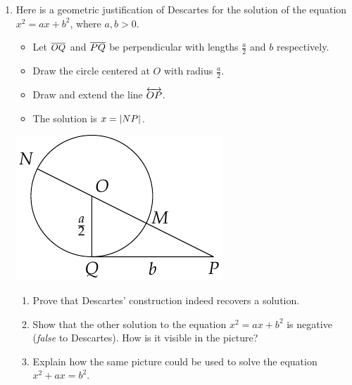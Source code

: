 \begin{exercises}{}{}
\begin{enumerate}
	  \item Here is a geometric justification of Descartes for the solution of the equation $x^2=ax+b^2$, where $a,b>0$.
	  \par
		\begin{minipage}[t]{0.6\linewidth}\vspace{-5pt}
			\begin{itemize}\itemsep0pt
			  \item Let $\overline{OQ}$ and $\overline{PQ}$ be perpendicular with lengths $\frac a2$ and $b$ respectively.
			  \item Draw the circle centered at $O$ with radius $\frac a2$.
			  \item Draw and extend the line $\overleftrightarrow{OP}$.
			  \item The solution is $x=\left| NP\right|$.
			\end{itemize}
		\end{minipage}
		\hfill
		\begin{minipage}[t]{0.35\linewidth}\vspace{-10pt}
			\includegraphics{descartes-quad}
		\end{minipage}\par
		\begin{enumerate}
		  \item Prove that Descartes' construction indeed recovers a solution.
	  
		  \item Show that the other solution to the equation $x^2=ax+b^2$ is negative (\emph{false} to Descartes). How is it visible in the picture?
	  	
		  \item Explain how the same picture could be used to solve the equation $x^2+ax=b^2$.
		\end{enumerate}
	\end{enumerate}
\end{exercises}


% 

